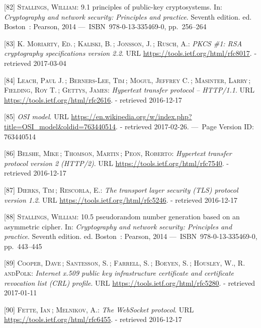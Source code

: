 \documentclass[12pt,english,a4paper,titlepage,cleardoublepage=empty,dottedtoc]{report}
\begin{document}
\hypertarget{ref-book_2014_chapter-9-1-public-key-crypto}{}
{[}82{]} \textsc{Stallings, William}: 9.1 principles of public-key
cryptosystems. In: \emph{Cryptography and network security: Principles
and practice}. Seventh edition. ed. Boston~: Pearson, 2014
---~ISBN~978-0-13-335469-0, pp.~256--264

\hypertarget{ref-web_spec_rsa}{}
{[}83{]} \textsc{K. Moriarty, Ed.}\,; \textsc{Kaliski, B.}\,;
\textsc{Jonsson, J.}\,; \textsc{Rusch, A.}: \emph{PKCS \#1: RSA
cryptography specifications version 2.2}. URL
\url{https://tools.ietf.org/html/rfc8017}. - retrieved 2017-03-04

\hypertarget{ref-web_spec_http1}{}
{[}84{]} \textsc{Leach, Paul J.}\,; \textsc{Berners-Lee, Tim}\,;
\textsc{Mogul, Jeffrey C.}\,; \textsc{Masinter, Larry}\,;
\textsc{Fielding, Roy T.}\,; \textsc{Gettys, James}: \emph{Hypertext
transfer protocol -- HTTP/1.1}. URL
\url{https://tools.ietf.org/html/rfc2616}. - retrieved 2016-12-17

\hypertarget{ref-web_2017_wikipedia_osi-model}{}
{[}85{]} \emph{OSI model}. URL
\url{https://en.wikipedia.org/w/index.php?title=OSI_model\&oldid=763440514}.
- retrieved 2017-02-26. ---~Page Version ID: 763440514

\hypertarget{ref-web_spec_http2}{}
{[}86{]} \textsc{Belshe, Mike}\,; \textsc{Thomson, Martin}\,;
\textsc{Peon, Roberto}: \emph{Hypertext transfer protocol version 2
(HTTP/2)}. URL \url{https://tools.ietf.org/html/rfc7540}. - retrieved
2016-12-17

\hypertarget{ref-web_spec_tls}{}
{[}87{]} \textsc{Dierks, Tim}\,; \textsc{Rescorla, E.}: \emph{The
transport layer security (TLS) protocol version 1.2}. URL
\url{https://tools.ietf.org/html/rfc5246}. - retrieved 2016-12-17

\hypertarget{ref-book_2014_chapter-14-5-pki}{}
{[}88{]} \textsc{Stallings, William}: 10.5 pseudorandom number
generation based on an asymmetric cipher. In: \emph{Cryptography and
network security: Principles and practice}. Seventh edition. ed.
Boston~: Pearson, 2014 ---~ISBN~978-0-13-335469-0, pp.~443--445

\hypertarget{ref-web_spec_x509}{}
{[}89{]} \textsc{Cooper, Dave}\,; \textsc{Santesson, S.}\,;
\textsc{Farrell, S.}\,; \textsc{Boeyen, S.}\,; \textsc{Housley, W.,
\textnormal{R. andPolk}}: \emph{Internet x.509 public key infrastructure
certificate and certificate revocation list (CRL) profile}. URL
\url{https://tools.ietf.org/html/rfc5280}. - retrieved 2017-01-11

\hypertarget{ref-web_spec_websockets}{}
{[}90{]} \textsc{Fette, Ian}\,; \textsc{Melnikov, A.}: \emph{The
WebSocket protocol}. URL \url{https://tools.ietf.org/html/rfc6455}. -
retrieved 2016-12-17
\end{document}
